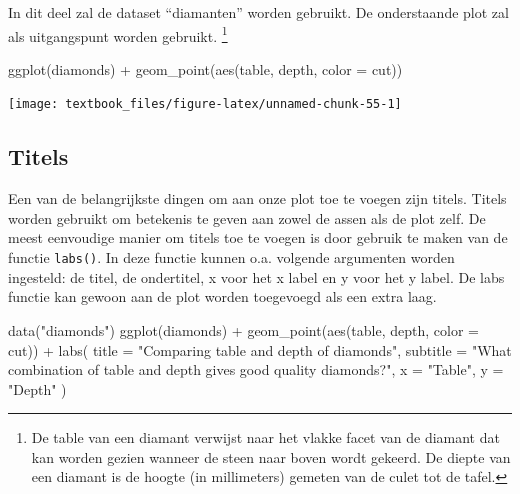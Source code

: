 \documentclass[]{tufte-book}
\newenvironment{Shaded}{}{}
\newcommand{\AttributeTok}[1]{\textcolor[rgb]{0.49,0.56,0.16}{#1}}
\newcommand{\FunctionTok}[1]{\textcolor[rgb]{0.02,0.16,0.49}{#1}}
\newcommand{\NormalTok}[1]{#1}
\newcommand{\SpecialCharTok}[1]{\textcolor[rgb]{0.25,0.44,0.63}{#1}}
\newcommand{\StringTok}[1]{\textcolor[rgb]{0.25,0.44,0.63}{#1}}
\begin{document}
In dit deel zal de dataset ``diamanten'' worden gebruikt. De onderstaande plot zal als uitgangspunt worden gebruikt. \footnote{De table van een diamant verwijst naar het vlakke facet van de diamant dat kan worden gezien wanneer de steen naar boven wordt gekeerd. De diepte van een diamant is de hoogte (in millimeters) gemeten van de culet tot de tafel.}

\begin{Shaded}
\begin{Highlighting}[]
\FunctionTok{ggplot}\NormalTok{(diamonds) }\SpecialCharTok{+}
  \FunctionTok{geom\_point}\NormalTok{(}\FunctionTok{aes}\NormalTok{(table, depth, }\AttributeTok{color =}\NormalTok{ cut))}
\end{Highlighting}
\end{Shaded}

\texttt{[image: textbook\_files/figure-latex/unnamed-chunk-55-1]}

\hypertarget{titels}{%
\subsection{Titels}\label{titels}}

Een van de belangrijkste dingen om aan onze plot toe te voegen zijn titels. Titels worden gebruikt om betekenis te geven aan zowel de assen als de plot zelf. De meest eenvoudige manier om titels toe te voegen is door gebruik te maken van de functie \texttt{labs()}. In deze functie kunnen o.a. volgende argumenten worden ingesteld: de titel, de ondertitel, x voor het x label en y voor het y label. De labs functie kan gewoon aan de plot worden toegevoegd als een extra laag.

\begin{Shaded}
\begin{Highlighting}[]
\FunctionTok{data}\NormalTok{(}\StringTok{"diamonds"}\NormalTok{)}
\FunctionTok{ggplot}\NormalTok{(diamonds) }\SpecialCharTok{+}
  \FunctionTok{geom\_point}\NormalTok{(}\FunctionTok{aes}\NormalTok{(table, depth, }\AttributeTok{color =}\NormalTok{ cut)) }\SpecialCharTok{+}
  \FunctionTok{labs}\NormalTok{(}
    \AttributeTok{title =} \StringTok{"Comparing table and depth of diamonds"}\NormalTok{,}
    \AttributeTok{subtitle =} \StringTok{"What combination of table and depth gives good quality diamonds?"}\NormalTok{,}
    \AttributeTok{x =} \StringTok{"Table"}\NormalTok{,}
    \AttributeTok{y =} \StringTok{"Depth"}
\NormalTok{  )}
\end{Highlighting}
\end{Shaded}
\end{document}
